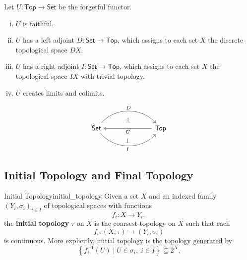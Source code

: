 \documentclass{report}
\begin{document}
\begin{proposition}{}{}
	Let $U:\mathsf{Top}\to\mathsf{Set}$ be the forgetful functor.
	\begin{enumerate}[(i)]
		\item $U$ is faithful.
		\item $U$ has a left adjoint $D:\mathsf{Set}\to\mathsf{Top}$, which assigns to each set $X$ the discrete topological space $DX$.
		\item $U$ has a right adjoint $I:\mathsf{Set}\to\mathsf{Top}$, which assigns to each set $X$ the topological space $IX$ with trivial topology.
		\item $U$ creates limits and colimits.
	\end{enumerate}
	\[
		\begin{tikzcd}[ampersand replacement=\&]
			\mathsf{Set}  \arrow[r, "D"{name=A, above}, bend left=49] \arrow[r, "I"'{name=C, below}, bend right=49] \&[+45pt] \mathsf{Top} \arrow[l, "U"'{name=B, below}]
			\arrow[phantom, shorten <=5.5pt, shorten >=5.5pt, from=A.south-|B, to=B, "\bot"']
			\arrow[phantom, shorten <=5.5pt, shorten >=5.5pt, from=B.south-|C, to=C, "\bot"']
		\end{tikzcd}
	\]
\end{proposition}
\subsection{Initial Topology and Final Topology}
\begin{definition}{Initial Topology}{initial_topology}
	Given a set $X$ and an indexed family $\left(Y_i, \sigma_i\right)_{i \in I}$ of topological spaces with functions
	$$
	f_i: X \rightarrow Y_i,
	$$
	the \textbf{initial topology} $\tau$ on $X$ is the coarsest topology on $X$ such that each
	$$
	f_i:(X, \tau) \rightarrow (Y_i, \sigma_i)
	$$
	is continuous. More explicitly, initial topology is the topology \hyperref[th:generated_topology]{generated} by 
	\[
	\left\{ f^{-1}_i(U) \mid U\in \sigma_i, \;i \in I \right\}\subseteq 2^X.
	\]
\end{definition}
\end{document}
